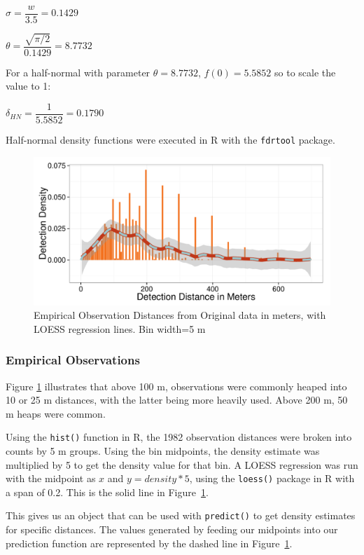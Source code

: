 \documentclass[12pt]{article}
\begin{document}
$\sigma = \dfrac{w}{3.5} = 0.1429$

$\theta = \dfrac{\sqrt{\pi /2}}{0.1429}=8.7732$

For a half-normal with parameter $\theta=8.7732$, $f(0)=5.5852$ so to scale the value to 1:
\begin{center}
$\delta_{HN} = \dfrac{1}{5.5852} = 0.1790$
\end{center}


Half-normal density functions were executed in R with the \texttt{fdrtool} package.
\begin{figure}
	\includegraphics[width=\textwidth]{../images/loess.pdf}
	\caption{Empirical Observation Distances from Original data in meters, with LOESS regression lines. Bin width=5 m\label{fig:by5}}
\end{figure}
\subsubsection{Empirical Observations}
Figure \ref{fig:by5} illustrates that above 100 m, observations were commonly heaped into 10 or 25 m distances, with the latter being more heavily used. Above 200 m, 50 m heaps were common. 

Using the \texttt{hist()} function in R, the 1982 observation distances were broken into counts by 5 m groups. Using the bin midpoints, the density estimate was multiplied by 5 to get the density value for that bin. A LOESS regression was run with the midpoint as $x$ and $y=density*5$, using the \texttt{loess()} package in R with a span of 0.2. This is the solid line in Figure~\ref{fig:by5}. 

This gives us an object that can be used with \texttt{predict()} to get density estimates for specific distances. The values generated by feeding our midpoints into our prediction function are represented by the dashed line in Figure~\ref{fig:by5}. 
\end{document}
